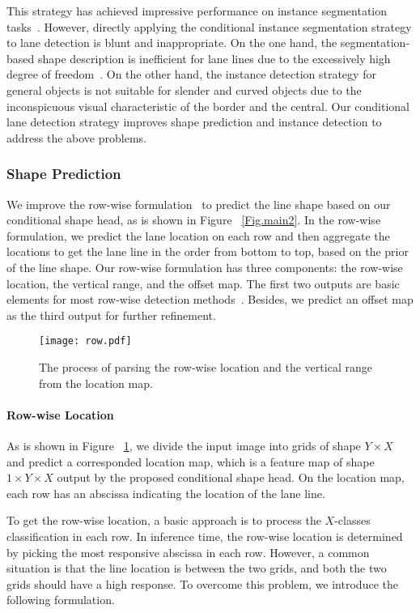 \documentclass[10pt,twocolumn,letterpaper]{article}
\begin{document}
This strategy has achieved impressive performance on instance segmentation tasks~\cite{tian2020conditional, wang2020solov2}. However, directly applying the conditional instance segmentation strategy to lane detection is blunt and inappropriate. On the one hand, the segmentation-based shape description is inefficient for lane lines due to the excessively high degree of freedom~\cite{qin2020ultra}. On the other hand, the instance detection strategy for general objects is not suitable for slender and curved objects due to the inconspicuous visual characteristic of the border and the central. Our conditional lane detection strategy improves shape prediction and instance detection to address the above problems.

\subsubsection{Shape Prediction}
We improve the row-wise formulation~\cite{qin2020ultra} to predict the line shape based on our conditional shape head, as is shown in Figure ~\ref{Fig.main2}. In the row-wise formulation, we predict the lane location on each row and then 
aggregate the locations to get the lane line in the order from bottom to top, based on the prior of the line shape. Our row-wise formulation has three components: the row-wise location, the vertical range, and the offset map. The first two outputs are basic elements for most row-wise detection methods~\cite{qin2020ultra, yoo2020end}. Besides, we predict an offset map as the third output for further refinement.

\begin{figure}[ht]
\centering
\texttt{[image: row.pdf]}
\caption{The process of parsing the row-wise location and the vertical range from the location map.} \label{Fig.row} \end{figure}

\paragraph{Row-wise Location}
As is shown in Figure ~\ref{Fig.row}, we divide the input image into grids of shape \(Y\times X\) and predict a corresponded location map, which is a feature map of shape \(1\times Y\times X\) output by the proposed conditional shape head. On the location map, each row has an abscissa indicating the location of the lane line.

To get the row-wise location, a basic approach is to process the \(X\)-classes classification in each row. In inference time, the row-wise location is determined by picking the most responsive abscissa in each row. However, a common situation is that the line location is between the two grids, and both the two grids should have a high response. To overcome this problem, we introduce the following formulation.
\end{document}
